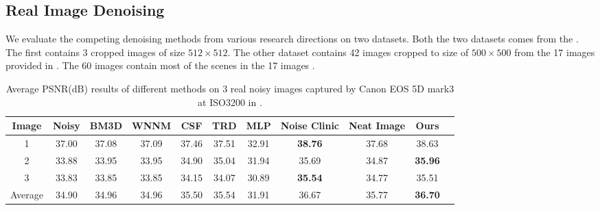 \documentclass[10pt,twocolumn,letterpaper]{article}
\begin{document}
\subsection{Real Image Denoising}
We evaluate the competing denoising methods from various research directions on two datasets. Both the two datasets comes from the \cite{crosschannel2016}. The first contains 3 cropped images of size $512\times512$. The other dataset contains 42 images cropped to size of $500\times500$ from the 17 images provided in \cite{crosschannel2016}. The 60 images contain most of the scenes in the 17 images \cite{crosschannel2016}.
\begin{table*}
\caption{Average PSNR(dB) results of different methods on 3 real noisy images captured by Canon EOS 5D mark3 at ISO3200 in \cite{crosschannel2016}.}
\label{tab1}
\begin{center}
\renewcommand\arraystretch{1}
\begin{tabular}{|c||c|c|c|c|c|c|c|c|c|c|}
\hline
Image & \textbf{Noisy} &\textbf{BM3D}&\textbf{WNNM}&\textbf{CSF}&\textbf{TRD}&\textbf{MLP}& \textbf{Noise Clinic}& \textbf{Neat Image}&\textbf{Ours}
\\
\hline
1& 37.00 & 37.08 & 37.09 &  37.46  &  37.51  &  32.91  & \textbf{ 38.76}  & 37.68   & 38.63  
\\
\hline
2& 33.88 & 33.95  &  33.95  &  34.90  &  35.04  & 31.94   &  35.69  &  34.87  & \textbf{ 35.96 }
\\
\hline
3& 33.83  & 33.85  & 33.85   & 34.15   &   34.07 & 30.89   & \textbf{35.54 }  &  34.77  &  35.51 
\\
\hline
Average & 34.90  &  34.96 &  34.96  & 35.50   & 35.54   &  31.91  &  36.67  &  35.77  &  \textbf{ 36.70}
\\
\hline
\end{tabular}
\end{center}
\end{table*}
\end{document}
